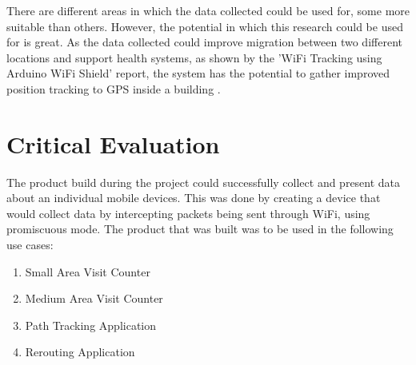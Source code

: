 \documentclass{report}
\begin{document}
There are different areas in which the data collected could be used for, some more suitable than others. However, the potential in which this research could be used for is great. As the data collected could improve migration between two different locations and support health systems, as shown by the 'WiFi Tracking using Arduino WiFi Shield' report\cite{ProtrackingArduino}, the system has the potential to gather improved position tracking to GPS inside a building .  
\chapter{Critical Evaluation}
The product build during the project could successfully collect and present data about an individual mobile devices. This was done by creating a device that would collect data by intercepting packets being sent through WiFi, using promiscuous mode\cite{Promiscuous_mode}. The product that was built was to be used in the following use cases: 
\begin{enumerate}
    \item Small Area Visit Counter
    \item Medium Area Visit Counter
    \item Path Tracking Application
    \item Rerouting Application
\end{enumerate}
\end{document}
